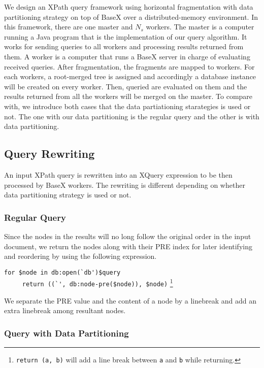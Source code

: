 We design an XPath query framework using horizontal fragmentation with data
partitioning strategy on top of BaseX over a distributed-memory environment.  In
this framework, there are one master and $N_s$ workers. The master is a computer
running a Java program that is the implementation of our query algorithm. It
works for sending queries to all workers and processing results returned from
them. A worker is a computer that runs a BaseX server in charge of evaluating
received queries.  After fragmentation, the fragments are mapped to workers. For
each workers, a root-merged tree is assigned and accordingly a database instance
will be created on every worker. Then, queried are evaluated on them  and the
results returned from all the workers will be merged on the master. To compare
with, we introduce both cases that the data partiationing starategies is used or
not. The one with our data partitioning is the regular query and the other is
with data partitioning. 

\subsection{Query Rewriting}

An input XPath query is rewritten into an XQuery expression to be then processed
by BaseX workers. The rewriting is different depending on whether data
partitioning strategy is used or not.

\subsubsection{Regular Query}
\label{no-dps}

Since the nodes in the results will no long follow the original order in the
input document, we return the nodes along with their PRE index for later
identifying and reordering by using the following expression.

\verb|for $node in db:open(`db')$query|\\
\verb|     return ((`', db:node-pre($node)), $node)|
\footnote{\texttt{return (a, b)} will add a line break between \texttt{a} and
	\texttt{b} while returning.}

We separate the PRE value and the content of a node by a linebreak and add an
extra linebreak among resultant nodes.

\subsubsection{Query with Data Partitioning}


